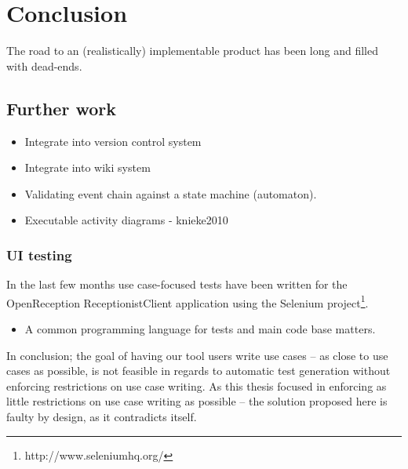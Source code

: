 \chapter{Conclusion}
The road to an (realistically) implementable product has been long and filled with dead-ends.
\section{Further work}
\begin{itemize}
  \item Integrate into version control system
  \item Integrate into wiki system
  \item Validating event chain against a state machine (automaton).
  \item Executable activity diagrams - knieke2010 
\end{itemize}


\subsection{UI testing}
In the last few months use case-focused tests have been written for the OpenReception ReceptionistClient application using the Selenium project\footnote{http://www.seleniumhq.org/}.

\begin{itemize}
  \item A common programming language for tests and main code base matters.
\end{itemize}


In conclusion; the goal of having our tool users write use cases -- as close to use cases as possible, is not feasible in regards to automatic test generation without enforcing restrictions on use case writing. As this thesis focused in enforcing as little restrictions on use case writing as possible -- the solution proposed here is faulty by design, as it contradicts itself.
